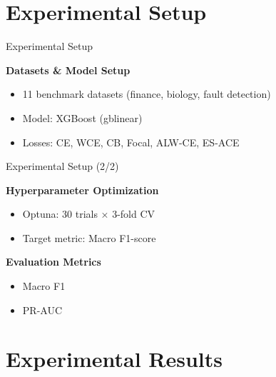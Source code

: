 \documentclass[aspectratio=169]{beamer}
\renewcommand{\textbf}[1]{\textcolor{SejongBlue}{\sf\bfseries #1}}
\begin{document}
\section{Experimental Setup}

\begin{frame}{Experimental Setup}

\textbf{Datasets \& Model Setup}
\begin{itemize}
  \item 11 benchmark datasets (finance, biology, fault detection)
  \item Model: XGBoost (gblinear)
  \item Losses: CE, WCE, CB, Focal, ALW-CE, ES-ACE
\end{itemize}

\end{frame}

\begin{frame}{Experimental Setup (2/2)}

\textbf{Hyperparameter Optimization}
\begin{itemize}
  \item Optuna: 30 trials × 3-fold CV
  \item Target metric: Macro F1-score
\end{itemize}

\textbf{Evaluation Metrics}
\begin{itemize}
  \item Macro F1 
  \item PR-AUC 
\end{itemize}

\end{frame}

\section{Experimental Results}
\end{document}
